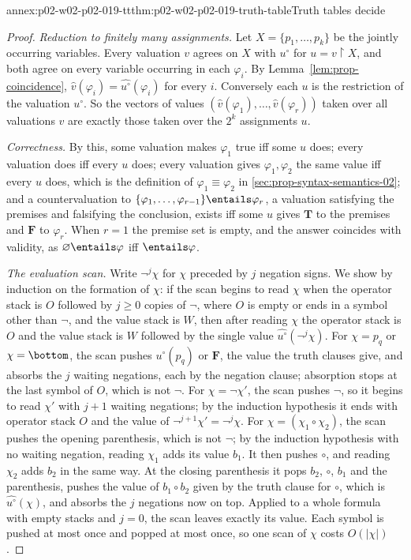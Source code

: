 \begin{annexitem}{annex:p02-w02-p02-019-tt}{thm:p02-w02-p02-019-truth-table}{Truth tables decide}
\begin{proof}
\emph{Reduction to finitely many assignments.}  Let \(X=\{p_1,\ldots,p_k\}\)
be the jointly occurring variables.  Every valuation \(v\) agrees on \(X\)
with \(u^{\circ}\) for \(u=v\mathbin{\upharpoonright}X\), and both agree on
every variable occurring in each \(\varphi_i\).  By
Lemma~\ref{lem:prop-coincidence}, \(\widehat v(\varphi_i)=
\widehat{u^{\circ}}(\varphi_i)\) for every \(i\).  Conversely each \(u\) is the
restriction of the valuation \(u^{\circ}\).  So the vectors of values
\((\widehat v(\varphi_1),\ldots,\widehat v(\varphi_r))\) taken over all
valuations \(v\) are exactly those taken over the \(2^k\) assignments \(u\).

\emph{Correctness.}  By this, some valuation makes \(\varphi_1\) true iff some
\(u\) does; every valuation does iff every \(u\) does; every valuation gives
\(\varphi_1,\varphi_2\) the same value iff every \(u\) does, which is the
definition of \(\varphi_1\equiv\varphi_2\) in
\cref{sec:prop-syntax-semantics-02}; and a countervaluation to
\(\{\varphi_1,\ldots,\varphi_{r-1}\}\entails\varphi_r\), a valuation
satisfying the premises and falsifying the conclusion, exists iff some \(u\)
gives \(\mathbf{T}\) to the premises and \(\mathbf{F}\) to \(\varphi_r\).  When
\(r=1\) the premise set is empty, and the answer coincides with validity, as
\(\varnothing\entails\varphi\) iff \(\entails\varphi\).

\emph{The evaluation scan.}  Write \(\neg^j\chi\) for \(\chi\) preceded by
\(j\) negation signs.  We show by induction on the formation of \(\chi\): if
the scan begins to read \(\chi\) when the operator stack is \(O\) followed by
\(j\geq 0\) copies of \(\neg\), where \(O\) is empty or ends in a symbol other
than \(\neg\), and the value stack is \(W\), then after reading \(\chi\) the
operator stack is \(O\) and the value stack is \(W\) followed by the single
value \(\widehat{u^{\circ}}(\neg^j\chi)\).
For \(\chi=p_q\) or \(\chi=\bottom\), the scan pushes \(u^{\circ}(p_q)\) or
\(\mathbf{F}\), the value the truth clauses give, and absorbs the \(j\) waiting
negations, each by the negation clause; absorption stops at the last symbol
of \(O\), which is not \(\neg\).
For \(\chi=\neg\chi'\), the scan pushes \(\neg\), so it begins to read
\(\chi'\) with \(j+1\) waiting negations; by the induction hypothesis it ends
with operator stack \(O\) and the value of \(\neg^{j+1}\chi'=\neg^j\chi\).
For \(\chi=(\chi_1\circ\chi_2)\), the scan pushes the opening parenthesis,
which is not \(\neg\); by the induction hypothesis with no waiting negation,
reading \(\chi_1\) adds its value \(b_1\).  It then pushes \(\circ\), and
reading \(\chi_2\) adds \(b_2\) in the same way.  At the closing parenthesis it
pops \(b_2\), \(\circ\), \(b_1\) and the parenthesis, pushes the value of
\(b_1\circ b_2\) given by the truth clause for \(\circ\), which is
\(\widehat{u^{\circ}}(\chi)\), and absorbs the \(j\) negations now on top.
Applied to a whole formula with empty stacks and \(j=0\), the scan leaves
exactly its value.  Each symbol is pushed at most once and popped at most
once, so one scan of \(\chi\) costs \(O(|\chi|)\).


\end{proof}
\end{annexitem}
